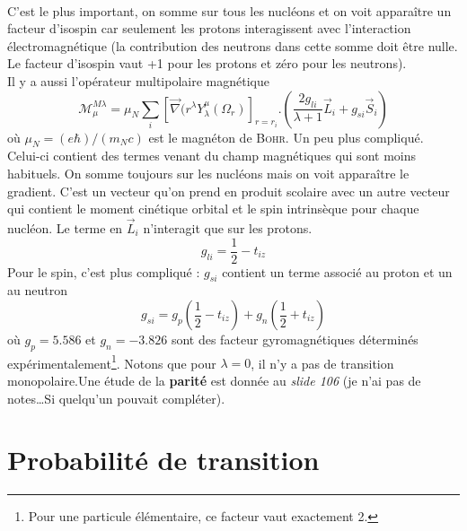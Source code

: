 \ \\

C'est le plus important, on somme sur tous les nucléons et on voit apparaître un facteur d'isospin car 
seulement les protons interagissent avec l'interaction électromagnétique (la contribution des neutrons dans
cette somme doit être nulle. Le facteur d'isospin vaut +1 pour les protons et zéro pour les neutrons).\ \\

Il y a aussi l'opérateur multipolaire magnétique
\begin{equation}
\mathcal{M}_\mu^{M\lambda} = \mu_N\sum_i[\vec\nabla(r^\lambda Y_\lambda^\mu(\Omega_r)]_{r=r_i}.\left(
\frac{2g_{li}}{\lambda+1}\vec{L}_i+g_{si}\vec{S}_i\right)
\end{equation}
où $\mu_N = (e\hbar)/(m_Nc)$ est le magnéton de \textsc{Bohr}. Un peu plus compliqué. Celui-ci contient des termes
venant du champ magnétiques qui sont moins habituels. On somme toujours sur les nucléons mais on voit apparaître le
gradient. C'est un vecteur qu'on prend en produit scolaire avec un autre vecteur qui contient le moment cinétique
orbital et le spin intrinsèque pour chaque nucléon. Le terme en $\vec L_i$ n'interagit que sur les protons. 
\begin{equation}
g_{li} = \frac{1}{2}-t_{iz}
\end{equation}
Pour le spin, c'est plus compliqué : $g_{si}$ contient un terme associé au proton et un au neutron
\begin{equation}
g_{si} = g_p\left(\frac{1}{2}-t_{iz}\right)+g_n\left(\frac{1}{2}+t_{iz}\right)
\end{equation}
où $g_p=5.586$ et $g_n=-3.826$ sont des facteur gyromagnétiques déterminés expérimentalement\footnote{Pour une
particule élémentaire, ce facteur vaut exactement 2.}. Notons que pour $\lambda = 0$, il n'y a pas de transition monopolaire.Une étude de la \textbf{parité} est donnée au \textit{slide 106} (je n'ai pas de notes\dots Si 
quelqu'un pouvait compléter).


\section{Probabilité de transition}
